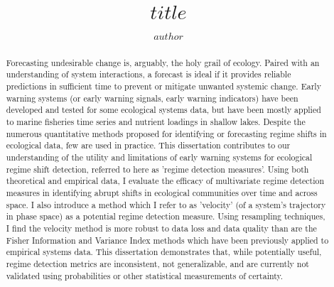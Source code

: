 \documentclass[print]{nuthesis}
\begin{document}
\frontmatter


\title{$title$}
\author{$author$}
\maketitle
\begin{abstract}
	Forecasting undesirable change is, arguably, the holy grail of ecology. Paired with an understanding of system interactions, a forecast is ideal if it provides reliable predictions in sufficient time to prevent or mitigate unwanted systemic change. Early warning systems (or early warning signals, early warning indicators) have been developed and tested for some ecological systems data, but have been mostly applied to marine fisheries time series and nutrient loadings in shallow lakes. Despite the numerous quantitative methods proposed for identifying or forecasting regime shifts in ecological data, few are used in practice. This dissertation contributes to our understanding of the utility and limitations of early warning systems for ecological regime shift detection, referred to here as 'regime detection measures'. 
	Using both theoretical and empirical data, I evaluate the efficacy of multivariate regime detection measures in identifying abrupt shifts in ecological communities over time and across space. I also introduce a method which I refer to as 'velocity' (of a system's trajectory in phase space) as a potential regime detection measure. Using resampling techniques, I find the velocity method is more robust to data loss and data quality than are the Fisher Information and Variance Index methods which have been previously applied to empirical systems data. This dissertation demonstrates that, while potentially useful, regime detection metrics are inconsistent, not generalizable, and are currently not validated using probabilities or other statistical measurements of certainty. 
\end{abstract}
\end{document}
